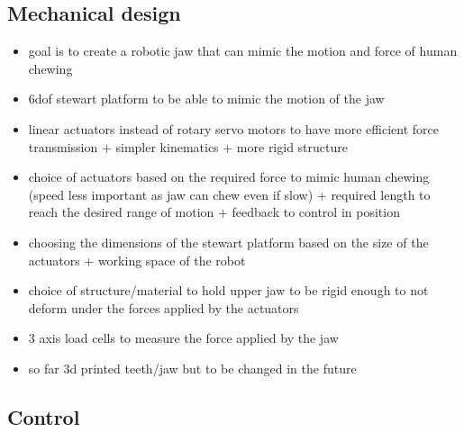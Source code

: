 \subsection{Mechanical design}
\begin{itemize}
    \item goal is to create a robotic jaw that can mimic the motion and force of human chewing 
    \item 6dof stewart platform to be able to mimic the motion of the jaw
    \item linear actuators instead of rotary servo motors to have more efficient force transmission + simpler kinematics + more rigid structure
    \item choice of actuators based on the required force to mimic human chewing (speed less important as jaw can chew even if slow) + required length to 
    reach the desired range of motion + feedback to control in position
    \item choosing the dimensions of the stewart platform based on the size of the actuators + working space of the robot
    \item choice of structure/material to hold upper jaw to be rigid enough to not deform under the forces applied by the actuators 
    \item 3 axis load cells to measure the force applied by the jaw
    \item so far 3d printed teeth/jaw but to be changed in the future
\end{itemize}

\subsection{Control}


